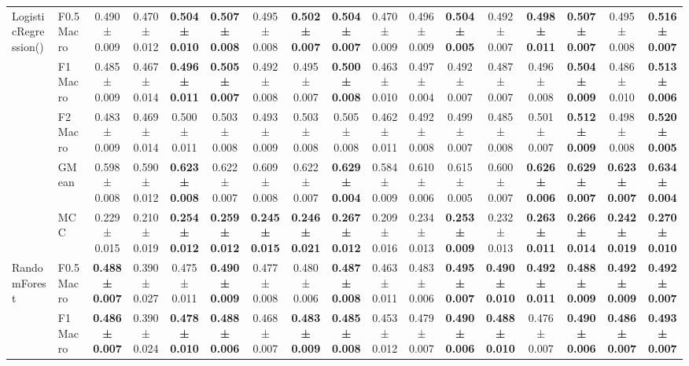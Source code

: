 \begin{table}[H]
{\begin{tabular}{llccccccccccccccc}
\cline{1-17}
\multirow[t]{5}{*}{LogisticRegression()} & F0.5 Macro & 0.490 ± 0.009 & 0.470 ± 0.012 & \textbf{0.504 ± 0.010} & \textbf{0.507 ± 0.008} & 0.495 ± 0.008 & \textbf{0.502 ± 0.007} & \textbf{0.504 ± 0.007} & 0.470 ± 0.009 & 0.496 ± 0.009 & \textbf{0.504 ± 0.005} & 0.492 ± 0.007 & \textbf{0.498 ± 0.011} & \textbf{0.507 ± 0.007} & 0.495 ± 0.008 & \textbf{0.516 ± 0.007} \\
 & F1 Macro & 0.485 ± 0.009 & 0.467 ± 0.014 & \textbf{0.496 ± 0.011} & \textbf{0.505 ± 0.007} & 0.492 ± 0.008 & 0.495 ± 0.007 & \textbf{0.500 ± 0.008} & 0.463 ± 0.010 & 0.497 ± 0.004 & 0.492 ± 0.007 & 0.487 ± 0.007 & 0.496 ± 0.008 & \textbf{0.504 ± 0.009} & 0.486 ± 0.010 & \textbf{0.513 ± 0.006} \\
 & F2 Macro & 0.483 ± 0.009 & 0.469 ± 0.014 & 0.500 ± 0.011 & 0.503 ± 0.008 & 0.493 ± 0.009 & 0.503 ± 0.008 & 0.505 ± 0.008 & 0.462 ± 0.011 & 0.492 ± 0.008 & 0.499 ± 0.007 & 0.485 ± 0.008 & 0.501 ± 0.007 & \textbf{0.512 ± 0.009} & 0.498 ± 0.008 & \textbf{0.520 ± 0.005} \\
 & GMean & 0.598 ± 0.008 & 0.590 ± 0.012 & \textbf{0.623 ± 0.008} & 0.622 ± 0.007 & 0.609 ± 0.008 & 0.622 ± 0.007 & \textbf{0.629 ± 0.004} & 0.584 ± 0.009 & 0.610 ± 0.006 & 0.615 ± 0.005 & 0.600 ± 0.007 & \textbf{0.626 ± 0.006} & \textbf{0.629 ± 0.007} & \textbf{0.623 ± 0.007} & \textbf{0.634 ± 0.004} \\
 & MCC & 0.229 ± 0.015 & 0.210 ± 0.019 & \textbf{0.254 ± 0.012} & \textbf{0.259 ± 0.012} & \textbf{0.245 ± 0.015} & \textbf{0.246 ± 0.021} & \textbf{0.267 ± 0.012} & 0.209 ± 0.016 & 0.234 ± 0.013 & \textbf{0.253 ± 0.009} & 0.232 ± 0.013 & \textbf{0.263 ± 0.011} & \textbf{0.266 ± 0.014} & \textbf{0.242 ± 0.019} & \textbf{0.270 ± 0.010} \\
\cline{1-17}
\multirow[t]{5}{*}{RandomForest} & F0.5 Macro & \textbf{0.488 ± 0.007} & 0.390 ± 0.027 & 0.475 ± 0.011 & \textbf{0.490 ± 0.009} & 0.477 ± 0.008 & 0.480 ± 0.006 & \textbf{0.487 ± 0.008} & 0.463 ± 0.011 & 0.483 ± 0.006 & \textbf{0.495 ± 0.007} & \textbf{0.490 ± 0.010} & \textbf{0.492 ± 0.011} & \textbf{0.488 ± 0.009} & \textbf{0.492 ± 0.009} & \textbf{0.492 ± 0.007} \\
 & F1 Macro & \textbf{0.486 ± 0.007} & 0.390 ± 0.024 & \textbf{0.478 ± 0.010} & \textbf{0.488 ± 0.006} & 0.468 ± 0.007 & \textbf{0.483 ± 0.009} & \textbf{0.485 ± 0.008} & 0.453 ± 0.012 & 0.479 ± 0.007 & \textbf{0.490 ± 0.006} & \textbf{0.488 ± 0.010} & 0.476 ± 0.007 & \textbf{0.490 ± 0.006} & \textbf{0.486 ± 0.007} & \textbf{0.493 ± 0.007} \\

\end{tabular}}
\end{table}
